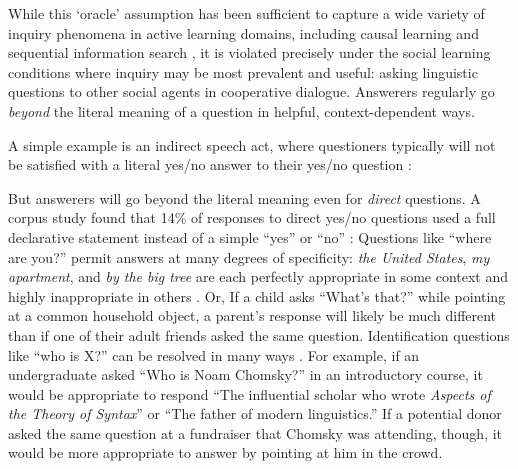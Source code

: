\documentclass[11pt, floatsintext]{apa6}
\begin{document}
While this `oracle' assumption has been sufficient to capture a wide variety of inquiry phenomena in active learning domains, including causal learning \cite{bramley2015conservative} and sequential information search \cite{RuggeriLombrozo15_ChildrenAdaptQuestions}, it is violated precisely under the social learning conditions where inquiry may be most prevalent and useful: asking linguistic questions to other social agents in cooperative dialogue.
Answerers regularly go \emph{beyond} the literal meaning of a question in helpful, context-dependent ways.

A simple example is an indirect speech act, where questioners typically will not be satisfied with a literal yes/no answer to their yes/no question \cite{Clark79_IndirectSpeechActs}:  
 
But answerers will go beyond the literal meaning even for \emph{direct} questions. 
A corpus study found that 14\% of responses to direct yes/no questions used a full declarative statement instead of a simple ``yes'' or ``no'' \cite{DeMarneffeGrimmPotts09_IndirectAnswersCorpus}:
Questions like ``where are you?'' permit answers at many degrees of specificity: \emph{the United States}, \emph{my apartment}, and \emph{by the big tree} are each perfectly appropriate in some context and highly inappropriate in others \cite{Potts12_CardsDialogueCorpus}. 
Or, If a child asks ``What's that?'' while pointing at a common household object, a parent's response will likely be much different than if one of their adult friends asked the same question. 
Identification questions like ``who is X?'' can be resolved in many ways  \cite{BoerLycan75_KnowingWho, Gerbrandy00_Identity, Aloni05_ConceptualCovers}. 
For example, if an undergraduate asked ``Who is Noam Chomsky?'' in an introductory course, it would be appropriate to respond ``The influential scholar who wrote \emph{Aspects of the Theory of Syntax}'' or ``The father of modern linguistics.'' 
If a potential donor asked the same question at a fundraiser that Chomsky was attending, though, it would be more appropriate to answer by pointing at him in the crowd. 
\end{document}
